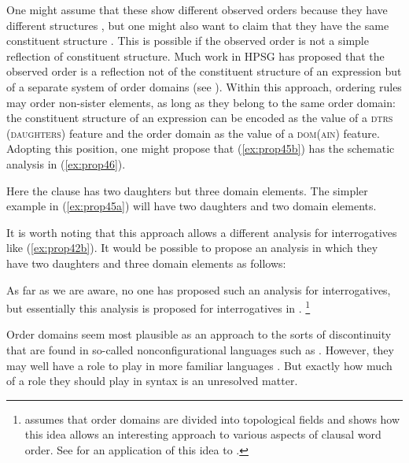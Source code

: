 \documentclass[output=paper,biblatex,babelshorthands,newtxmath,draftmode,colorlinks,citecolor=brown]{langscibook}
\begin{document}
\noindent
One might assume that these show different observed orders because they have different structures
\citep{Kiss2005a}, but one might also want to claim that they have the same constituent structure
\citep{KP95a}. This is possible if the observed order is not a simple reflection of constituent
structure. Much work in HPSG has proposed that the observed order is a reflection not of the
constituent structure of an expression but of a separate system of order domains (see
\citealp{Reape94a,Babel,Kathol2000a}). Within this approach, ordering rules may order non-sister
elements, as long as they belong to the same order domain: the constituent structure of an
expression can be encoded as the value of a \textsc{dtrs (daughters)} feature and the order domain
as the value of a \textsc{dom(ain)} feature. Adopting this position, one might propose that
(\ref{ex:prop45b}) has the schematic analysis in (\ref{ex:prop46}). 

\ea\label{ex:prop46}
\z

\noindent
Here the clause has two daughters but three domain elements. The simpler example in (\ref{ex:prop45a}) will have two daughters and two domain elements.

It is worth noting that this approach allows a different analysis for interrogatives like (\ref{ex:prop42b}). It would be possible to propose an analysis in which they have two daughters and three domain elements as follows:

\ea\label{ex:prop47}
\z

\noindent
As far as we are aware, no one has proposed such an analysis for  interrogatives, but
essentially this analysis is proposed for  interrogatives in \citet[81]{Kathol2000a}.%
%
\footnote{\citet{Kathol2000a} assumes that order domains are divided into topological fields and
  shows how this idea allows an interesting approach to various aspects of clausal word order. See
  \citet{Borsley:06} for an application of this idea to .} 
%

Order domains seem most plausible as an approach to the sorts of discontinuity that are found in
so-called nonconfigurational languages such as  \citep{DS99a}. However, they may well
have a role to play in more familiar languages \citep{BGM99a,Chaves2014a-u}. But exactly how much of
a role they should play in syntax is an unresolved matter. 
\end{document}
